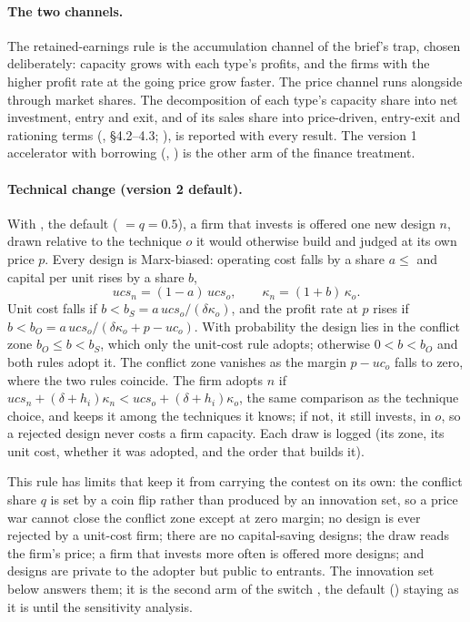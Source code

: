 \paragraph{The two channels.} The retained-earnings rule is the accumulation channel of
the brief's trap, chosen deliberately: capacity grows with each type's profits, and the
firms with the higher profit rate at the going price grow faster. The price channel runs
alongside through market shares. The decomposition of each type's capacity share into net
investment, entry and exit, and of its sales share into price-driven, entry-exit and
rationing terms (, \S4.2--4.3;
), is reported with every result. The version 1 accelerator
with borrowing (, ) is the
other arm of the finance treatment.

\paragraph{Technical change (version 2 default).} With , the default ( $= q = 0.5$), a firm that invests is
offered one new design $n$, drawn relative to the technique $o$ it would otherwise build and
judged at its own price $p$. Every design is Marx-biased: operating cost falls by a share
$a \le$  and capital per unit rises by a share $b$,
\[
ucs_n = (1-a)\,ucs_o, \qquad \kappa_n = (1+b)\,\kappa_o .
\]
Unit cost falls if $b < b_S = a\,ucs_o/(\delta\kappa_o)$, and the profit rate at $p$ rises if
$b < b_O = a\,ucs_o/(\delta\kappa_o + p - uc_o)$. With probability  the
design lies in the conflict zone $b_O \le b < b_S$, which only the unit-cost rule adopts;
otherwise $0 < b < b_O$ and both rules adopt it. The conflict zone vanishes as the margin
$p - uc_o$ falls to zero, where the two rules coincide. The firm adopts $n$ if
$ucs_n + (\delta + h_i)\kappa_n < ucs_o + (\delta + h_i)\kappa_o$, the same comparison as the
technique choice, and keeps it among the techniques it knows; if not, it still invests, in
$o$, so a rejected design never costs a firm capacity. Each draw is logged (its zone, its
unit cost, whether it was adopted, and the order that builds it).

This rule has limits that keep it from carrying the contest on its own: the conflict share
$q$ is set by a coin flip rather than produced by an innovation set, so a price war cannot
close the conflict zone except at zero margin; no design is ever rejected by a unit-cost
firm; there are no capital-saving designs; the draw reads the firm's price; a firm that
invests more often is offered more designs; and designs are private to the adopter but
public to entrants. The innovation set below answers them; it is the second arm of the
switch , the default () staying as it is until the
sensitivity analysis.

